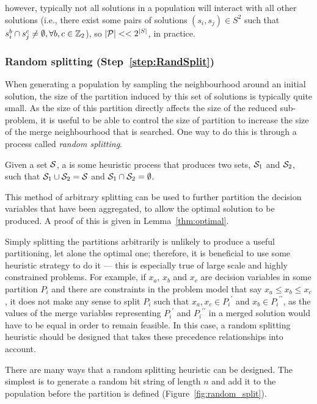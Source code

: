 \documentclass[journal]{IEEEtran}
\begin{document}
however, typically not all solutions in a population will interact with all other solutions (i.e., there exist some pairs of solutions $(s_i,s_j) \in S^2$ such that $s^b_i \cap s^c_j \neq \emptyset, \forall b,c \in \Bin$), so $|{\cal P}| << 2^{|S|}$, in practice.

\subsubsection*{\bf Random splitting (Step~\ref{step:RandSplit})}

When generating a population by sampling the neighbourhood around an initial solution, the size of the partition induced by this set of solutions is typically quite small. As the size of this partition directly affects the size of the reduced sub-problem, it is useful to be able to control the size of partition to increase the size of the merge neighbourhood that is searched. One way to do this is through a process called \emph{random splitting}. 
%
\begin{definition}\label{def:split}
Given a set $\S{S}$, a  is some heuristic process that produces two sets, $\S{S}_1$ and $\S{S}_2$, such that $\S{S}_1 \cup \S{S}_2 = \S{S}$ and $\S{S}_1 \cap \S{S}_2 = \emptyset$.
\end{definition}
%
This method of arbitrary splitting can be used to further partition the decision variables that have been aggregated, to allow the optimal solution to be produced. A proof of this is given in Lemma~\ref{thm:optimal}. 

Simply splitting the partitions arbitrarily is unlikely to produce a useful partitioning, let alone the optimal one; therefore, it is beneficial to use some heuristic strategy to do it --- this is especially true of large scale and highly constrained problems. For example, if $x_a$, $x_b$ and $x_c$ are decision variables in some partition $P_i$ and there are constraints in the problem model that say $x_a \leq x_b \leq x_c$, it does not make any sense to split $P_i$ such that $x_a,x_c \in {P_i}^\prime$ and $x_b \in {P_i}^{\prime\prime}$, as the values of the merge variables representing ${P_i}^\prime$ and ${P_i}^{\prime\prime}$ in a merged solution would have to be equal in order to remain feasible. In this case, a random splitting heuristic should be designed that takes these precedence relationships into account.

\medskip

There are many ways that a random splitting heuristic can be designed. The simplest is to generate a random bit string of length $n$ and add it to the population before the partition is defined (Figure~\ref{fig:random_split}). 
\end{document}
